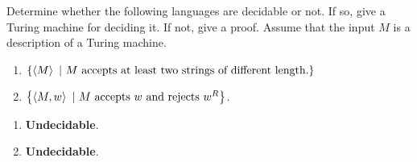 \documentclass{article}
\begin{document}
\begin{exercise}
Determine whether the following languages are decidable or not. If so, give a Turing machine for deciding it. If not, give a proof. Assume that the input $M$ is a description of a Turing machine.
\begin{enumerate}
 \item $\left\{ \left\langle M \right\rangle\ |\ \mbox{$M$ accepts at least two strings of different length.} \right\}$
 \item $\left\{ \left\langle M,w \right\rangle\ |\ \mbox{$M$ accepts $w$ and rejects $w^R$} \right\}$.
\end{enumerate}
\end{exercise}
\begin{answer}
\begin{enumerate}
 \item \textbf{Undecidable}.
 \item \textbf{Undecidable}.
\end{enumerate}

\end{answer}
\end{document}
